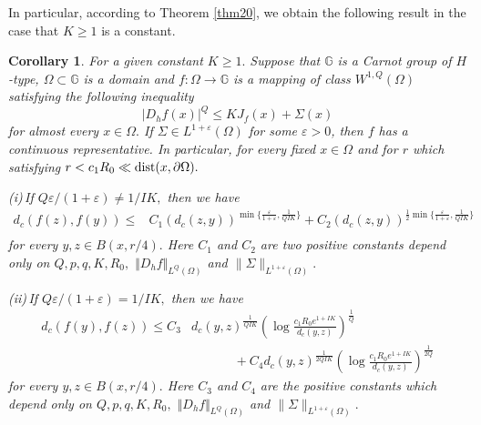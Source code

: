 \documentclass[11pt,twoside]{article}
\newtheorem{cor}[thm]{Corollary}
\theoremstyle{definition}
\theoremstyle{remark}
\begin{document}
In particular, according to Theorem \ref{thm20},  we obtain the following result in the case that  $K\geq1$ is a constant.
\begin{cor}\label{corroo}
For a given constant $K\geq1.$ Suppose that  $\mathbb{G}$ is a Carnot group of $H$-type, $\Omega\subset \mathbb{G}$ is a domain and $f:\Omega\rightarrow \mathbb{G}$ is a mapping of class $W^{1,Q}(\Omega)$ satisfying  the following inequality
$$\vert D_{h}f(x)\vert^{Q}\leq KJ_{f}(x)+\Sigma(x)$$
for almost every $x\in\Omega.$ If  $\Sigma\in L^{1+\varepsilon}(\Omega)$ for some $\varepsilon>0$, then $f$ has a continuous representative. In particular,  for every fixed $x\in\Omega$ and for $r$ which satisfying $r< c_{1}R_{0}\ll{\rm dist}(x,\partial\Omega).$

(i)\,If $Q\varepsilon/(1+\varepsilon)\neq1/IK,$  then we have
   \begin{equation}
 \begin{aligned}
d_{c}(f(z),f(y))
\leq &C_{1}(d_{c}(z,y))^{\min\Big\{\frac{\varepsilon}{1+\varepsilon},\frac{1}{QIK}\Big\}}+C_{2}(d_{c}(z,y))^{\frac{1}{2}\min\Big\{\frac{\varepsilon}{1+\varepsilon},\frac{1}{QIK}\Big\}}\\
\end{aligned}
\end{equation}
for every $y,z\in B(x,r/4).$  Here $C_{1}$ and $C_{2}$ are two positive constants depend only on $Q, p, q,K, R_{0},$ $
\Vert D_{h}f\Vert_{L^{Q}(\Omega)}$ and $ \|\Sigma\|_{L^{1+\varepsilon}(\Omega)}.$ 

(ii)\,If $Q\varepsilon/(1+\varepsilon)=1/IK,$ then we have 
  \begin{equation}
\begin{aligned}
d_{c}(f(y),f(z))\leq C_{3}&d_{c}(y,z)^{\frac{1}{QIK}}\left(\log\frac{c_{1}R_{0}e^{1+IK}}{d_{c}(y,z)}\right)^{\frac{1}{Q}}\\
&\,\,\,\,\,\,\,\,\,\,\,\,\,\,\,\,\,\,\,\,+C_{4}d_{c}(y,z)^{\frac{1}{2QIK}}\left(\log\frac{c_{1}R_{0}e^{1+IK}}{d_{c}(y,z)}\right)^{\frac{1}{2Q}}
\end{aligned}
\end{equation}
for every $y,z\in B(x,r/4).$   Here $C_{3}$ and $C_{4}$ are the positive constants which depend only on $Q, p, q,K, R_{0},$ $
\Vert D_{h}f\Vert_{L^{Q}(\Omega)}$ and $ \|\Sigma\|_{L^{1+\varepsilon}(\Omega)}.$  
\end{cor}
\end{document}
